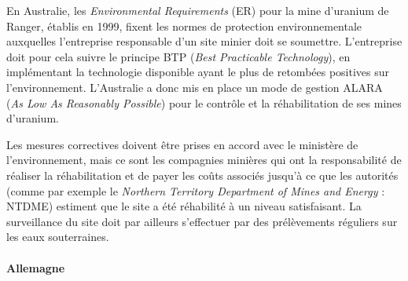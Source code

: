 \documentclass{article}
\begin{document}
En Australie, les \textit{Environmental Requirements} (ER) pour la mine d’uranium de Ranger, établis en 1999, fixent les normes de protection environnementale auxquelles l’entreprise responsable d’un site minier doit se soumettre.
L’entreprise doit pour cela suivre le principe BTP (\textit{Best Practicable Technology}), en implémentant la technologie disponible ayant le plus de retombées positives sur l’environnement. L’Australie a donc mis en place un mode de gestion ALARA (\textit{As Low As Reasonably Possible}) pour le contrôle et la réhabilitation de ses mines d’uranium.

Les mesures correctives doivent être prises en accord avec le ministère de l’environnement, mais ce sont les compagnies minières qui ont la responsabilité de réaliser la réhabilitation et de payer les coûts associés jusqu’à ce que les autorités (comme par exemple le \textit{Northern Territory Department of Mines and Energy} : NTDME) estiment que le site a été réhabilité à un niveau satisfaisant. La surveillance du site doit par ailleurs s’effectuer par des prélèvements réguliers sur les eaux souterraines.

\paragraph{Allemagne}
\end{document}
